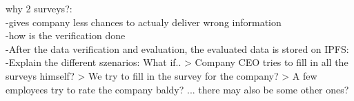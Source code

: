 why 2 surveys?:\\
-gives company less chances to actualy deliver wrong information\\
-how is the verification done\\
-After the data verification and evaluation, the evaluated data is stored on IPFS:\\
-Explain the different szenarios: What if.. 
              > Company CEO tries to fill in all the surveys himself?
              > We try to fill in the survey for the company?
              > A few employees try to rate the company baldy?
              ... there may also be some other ones?
